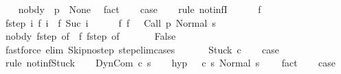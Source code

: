 \begin{isabellebody}
\ \ \isamarkupfalse%
\ no{\isacharunderscore}bdy{\isacharcolon}\ {\isachardoublequoteopen}{\isasymGamma}\ p\ {\isacharequal}\ None{\isachardoublequoteclose}\ \isamarkupfalse%
\ fact\isanewline
\ \ \isamarkupfalse%
\ {\isacharquery}case\isanewline
\ \ \isamarkupfalse%
\ {\isacharparenleft}rule\ not{\isacharunderscore}infI{\isacharparenright}\isanewline
\ \ \ \ \isamarkupfalse%
\ f\isanewline
\ \ \ \ \isamarkupfalse%
\ f{\isacharunderscore}step{\isacharcolon}\ {\isachardoublequoteopen}{\isasymAnd}i{\isachardot}\ {\isasymGamma}{\isasymturnstile}f\ i\ {\isasymrightarrow}\ f\ {\isacharparenleft}Suc\ i{\isacharparenright}{\isachardoublequoteclose}\isanewline
\ \ \ \ \isamarkupfalse%
\ f{\isacharunderscore}{}{\isacharcolon}\ {\isachardoublequoteopen}f\ {}\ {\isacharequal}\ {\isacharparenleft}Call\ p{\isacharcomma}\ Normal\ s{\isacharparenright}{\isachardoublequoteclose}\ \isanewline
\ \ \ \ \isamarkupfalse%
\ no{\isacharunderscore}bdy\ f{\isacharunderscore}step\ {\isacharbrackleft}of\ {}{\isacharbrackright}\ f{\isacharunderscore}{}\ f{\isacharunderscore}step\ {\isacharbrackleft}of\ {}{\isacharbrackright}\isanewline
\ \ \ \ \isamarkupfalse%
\ False\isanewline
\ \ \ \ \ \ \isamarkupfalse%
\ {\isacharparenleft}fastforce\ elim{\isacharcolon}\ Skip{\isacharunderscore}no{\isacharunderscore}step\ step{\isacharunderscore}elim{\isacharunderscore}cases{\isacharparenright}\isanewline
\ \ \isamarkupfalse%
\isanewline
{}\isamarkupfalse%
\isanewline
\ \ \isamarkupfalse%
\ {\isacharparenleft}Stuck\ c{\isacharparenright}\isanewline
\ \ \isamarkupfalse%
\ {\isacharquery}case\isanewline
\ \ \ \ \isamarkupfalse%
\ {\isacharparenleft}rule\ not{\isacharunderscore}inf{\isacharunderscore}Stuck{\isacharparenright}\isanewline
{}\isamarkupfalse%
\isanewline
\ \ \isamarkupfalse%
\ {\isacharparenleft}DynCom\ c\ s{\isacharparenright}\isanewline
\ \ \isamarkupfalse%
\ hyp{\isacharcolon}\ {\isachardoublequoteopen}{\isasymnot}\ {\isasymGamma}{\isasymturnstile}\ {\isacharparenleft}c\ s{\isacharcomma}\ Normal\ s{\isacharparenright}\ {\isasymrightarrow}\ {\isasymdots}{\isacharparenleft}{\isasyminfinity}{\isacharparenright}{\isachardoublequoteclose}\ \isamarkupfalse%
\ fact\isanewline
\ \ \isamarkupfalse%
\ {\isacharquery}case\isanewline

\end{isabellebody}
